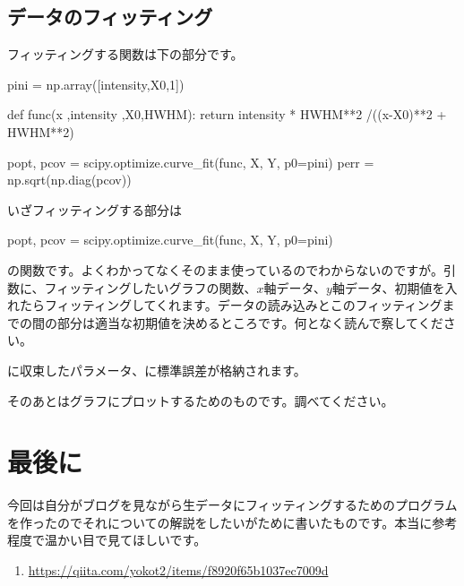 \documentclass[11pt,b5paper,papersize,dvipdfmx]{jsbook}
\begin{document}
%
\subsection{データのフィッティング}
フィッティングする関数は下の部分です。
\begin{kdncode-ii}
    pini = np.array([intensity,X0,1])

    def func(x ,intensity ,X0,HWHM):
        return intensity * HWHM**2 /((x-X0)**2 + HWHM**2)

    popt, pcov = scipy.optimize.curve_fit(func, X, Y, p0=pini)
    perr = np.sqrt(np.diag(pcov))
\end{kdncode-ii}
いざフィッティングする部分は
\begin{kdncode-i}
    popt, pcov = scipy.optimize.curve_fit(func, X, Y, p0=pini)
\end{kdncode-i}
の関数です。よくわかってなくそのまま使っているのでわからないのですが。引数に、フィッティングしたいグラフの関数、$x$軸データ、$y$軸データ、初期値を入れたらフィッティングしてくれます。データの読み込みとこのフィッティングまでの間の部分は適当な初期値を決めるところです。何となく読んで察してください。\par
{}に収束したパラメータ、に標準誤差が格納されます。\par
そのあとはグラフにプロットするためのものです。調べてください。

%
\section{最後に}
今回は自分がブログを見ながら生データにフィッティングするためのプログラムを作ったのでそれについての解説をしたいがために書いたものです。本当に参考程度で温かい目で見てほしいです。

\sanko
\begin{enumerate}
\item \url{https://qiita.com/yokot2/items/f8920f65b1037ec7009d}
\end{enumerate}
\end{document}
